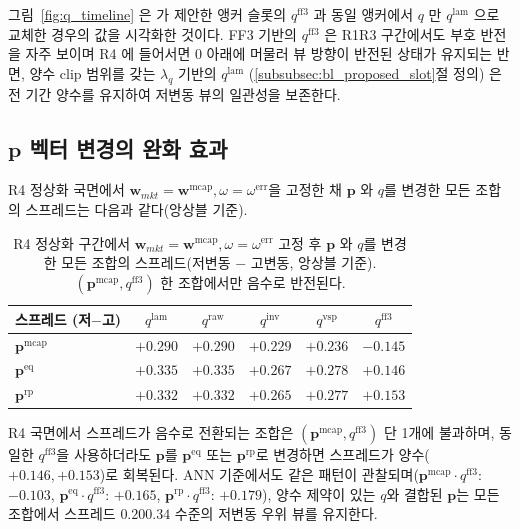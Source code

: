\documentclass{article}
\begin{document}
그림~\ref{fig:q_timeline} 은 \citet{pyo2018} 가 제안한 앵커 슬롯의 $q^{\mathrm{ff3}}$ 과 동일 앵커에서 $q$ 만 $q^{\mathrm{lam}}$ 으로 교체한 경우의 값을 시각화한 것이다. FF3 기반의 $q^{\mathrm{ff3}}$ 은 R1\textendash R3 구간에서도 부호 반전을 자주 보이며 R4 에 들어서면 0 아래에 머물러 뷰 방향이 반전된 상태가 유지되는 반면,
양수 clip 범위를 갖는 $\lambda_q$ 기반의 $q^{\mathrm{lam}}$ (\ref{subsubsec:bl_proposed_slot}절 정의) 은 전 기간 양수를 유지하여 저변동 뷰의 일관성을 보존한다.

\subsection{$\mathbf{p}$ 벡터 변경의 완화 효과}

R4 정상화 국면에서 $\mathbf{w}_{mkt} = \mathbf{w}^{\mathrm{mcap}}, \omega = \omega^{\mathrm{err}}$을 고정한 채 $\mathbf{p}$ 와 $q$를 변경한 모든 조합의 스프레드는 다음과 같다(앙상블 기준).

\begin{table}[ht]
\centering
\caption{R4 정상화 구간에서 $\mathbf{w}_{mkt} = \mathbf{w}^{\mathrm{mcap}}, \omega = \omega^{\mathrm{err}}$ 고정 후 $\mathbf{p}$ 와 $q$를 변경한 모든 조합의 스프레드(저변동 $-$ 고변동, 앙상블 기준).
$(\mathbf{p}^{\mathrm{mcap}}, q^{\mathrm{ff3}})$ 한 조합에서만 음수로 반전된다.}
\label{tab:r4_pq_spread}
\setlength{\tabcolsep}{10pt}
\renewcommand{\arraystretch}{1.2}
\small
\begin{tabular}{lccccc}
\toprule
스프레드 (저$-$고) & $q^{\mathrm{lam}}$ & $q^{\mathrm{raw}}$ & $q^{\mathrm{inv}}$ & $q^{\mathrm{vsp}}$ & $q^{\mathrm{ff3}}$ \\
\midrule
$\mathbf{p}^{\mathrm{mcap}}$ & $+0.290$ & $+0.290$ & $+0.229$ & $+0.236$ & $\mathbf{-0.145}$ \\
$\mathbf{p}^{\mathrm{eq}}$   & $+0.335$ & $+0.335$ & $+0.267$ & $+0.278$ & $+0.146$ \\
$\mathbf{p}^{\mathrm{rp}}$   & $+0.332$ & $+0.332$ & $+0.265$ & $+0.277$ & $+0.153$ \\
\bottomrule 
\end{tabular}
\end{table}

R4 국면에서 스프레드가 음수로 전환되는 조합은 $(\mathbf{p}^{\mathrm{mcap}}, q^{\mathrm{ff3}})$ 단 1개에 불과하며, 동일한 $q^{\mathrm{ff3}}$을 사용하더라도 $\mathbf{p}$를 $\mathbf{p}^{\mathrm{eq}}$ 또는 $\mathbf{p}^{\mathrm{rp}}$로 변경하면 스프레드가 양수($+0.146, +0.153$)로 회복된다. ANN 기준에서도 같은 패턴이 관찰되며($\mathbf{p}^{\mathrm{mcap}} \cdot q^{\mathrm{ff3}}$: $-0.103$, $\mathbf{p}^{\mathrm{eq}} \cdot q^{\mathrm{ff3}}$: $+0.165$, $\mathbf{p}^{\mathrm{rp}} \cdot q^{\mathrm{ff3}}$: $+0.179$), 양수 제약이 있는 $q$와 결합된 $\mathbf{p}$는 모든 조합에서 스프레드 $0.20$\textendash $0.34$ 수준의 저변동 우위 뷰를 유지한다.
\end{document}
